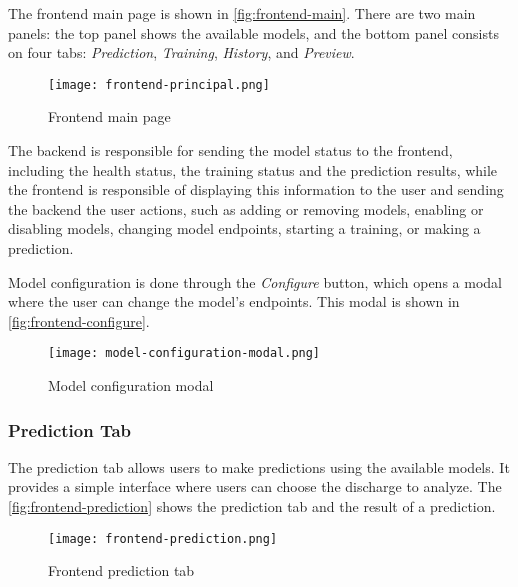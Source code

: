 The frontend main page is shown in \autoref{fig:frontend-main}. There are two main panels: the top panel shows the available models, and the bottom panel consists on four tabs: \textit{Prediction}, \textit{Training}, \textit{History}, and \textit{Preview}.

\begin{figure}[H]
    \centering
    \texttt{[image: frontend-principal.png]}
    \caption{Frontend main page}
    \label{fig:frontend-main}
\end{figure}

The backend is responsible for sending the model status to the frontend, including the health status, the training status and the prediction results, while the frontend is responsible of displaying this information to the user and sending the backend the user actions, such as adding or removing models, enabling or disabling models, changing model endpoints, starting a training, or making a prediction.

Model configuration is done through the \textit{Configure} button, which opens a modal where the user can change the model's endpoints. This modal is shown in \autoref{fig:frontend-configure}.

\begin{figure}[H]
    \centering
    \texttt{[image: model-configuration-modal.png]}
    \caption{Model configuration modal}
    \label{fig:frontend-configure}
\end{figure}

\subsubsection{Prediction Tab}

The prediction tab allows users to make predictions using the available models. It provides a simple interface where users can choose the discharge to analyze. The \autoref{fig:frontend-prediction} shows the prediction tab and the result of a prediction.

\begin{figure}[H]
    \centering
    \texttt{[image: frontend-prediction.png]}
    \caption{Frontend prediction tab}
    \label{fig:frontend-prediction}
\end{figure}

